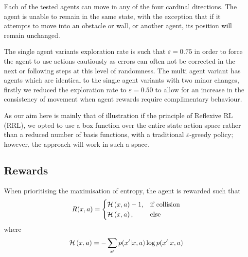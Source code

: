 \documentclass{article}
\begin{document}
Each of the tested agents can move in any of the four cardinal directions. The agent is unable to remain in the same state, with the exception that if it attempts to move into an obstacle or wall, or another agent, its position will remain unchanged. %

The single agent variants exploration rate is such that $\varepsilon=0.75$ in order to force the agent to use actions cautiously as errors can often not be corrected in the next or following steps at this level of randomness. The multi agent variant has agents which are identical to the single agent variants with two minor changes, firstly we reduced the exploration rate to $\varepsilon=0.50$ to allow for an increase in the consistency of movement when agent rewards require complimentary behaviour. 

As our aim here is mainly that of illustration if the principle of Reflexive RL (RRL), we opted to use a box function over the entire state action space rather than a reduced number of basis functions, with a traditional $\varepsilon$-greedy policy; however, the approach will work in such a space.

\subsection{Rewards}

When prioritising the maximisation of entropy, the agent is rewarded such that
\begin{equation}
R(x,a)=
\begin{cases}
{\cal H}\left(x,a\right)-1 ,& $if collision$ \\
{\cal H}\left(x,a\right),& $else$
\end{cases}
	\label{reward}
\end{equation}
where
\begin{equation}
{\cal H}\left(x,a\right) = -\sum_{x'} p(x'|x,a) \log p(x'|x,a)
\end{equation}
\end{document}

